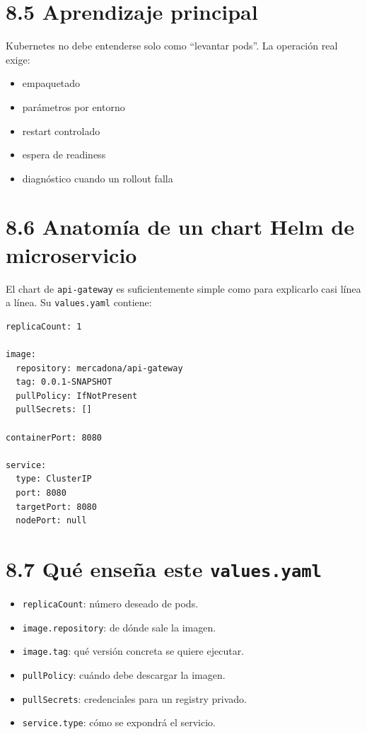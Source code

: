 \documentclass[
a4paper,
12pt]{report}
\providecommand{\tightlist}{%
  \setlength{\itemsep}{0pt}\setlength{\parskip}{0pt}}
\begin{document}
\section{8.5 Aprendizaje principal}\label{aprendizaje-principal}

Kubernetes no debe entenderse solo como ``levantar pods''. La operación
real exige:

\begin{itemize}
\tightlist
\item
  empaquetado
\item
  parámetros por entorno
\item
  restart controlado
\item
  espera de readiness
\item
  diagnóstico cuando un rollout falla
\end{itemize}

\section{8.6 Anatomía de un chart Helm de
microservicio}\label{anatomuxeda-de-un-chart-helm-de-microservicio}

El chart de \texttt{api-gateway} es suficientemente simple como para
explicarlo casi línea a línea. Su \texttt{values.yaml} contiene:

\begin{verbatim}
replicaCount: 1

image:
  repository: mercadona/api-gateway
  tag: 0.0.1-SNAPSHOT
  pullPolicy: IfNotPresent
  pullSecrets: []

containerPort: 8080

service:
  type: ClusterIP
  port: 8080
  targetPort: 8080
  nodePort: null
\end{verbatim}

\section{\texorpdfstring{8.7 Qué enseña este
\texttt{values.yaml}}{8.7 Qué enseña este values.yaml}}\label{quuxe9-enseuxf1a-este-values.yaml}

\begin{itemize}
\tightlist
\item
  \texttt{replicaCount}: número deseado de pods.
\item
  \texttt{image.repository}: de dónde sale la imagen.
\item
  \texttt{image.tag}: qué versión concreta se quiere ejecutar.
\item
  \texttt{pullPolicy}: cuándo debe descargar la imagen.
\item
  \texttt{pullSecrets}: credenciales para un registry privado.
\item
  \texttt{service.type}: cómo se expondrá el servicio.
\end{itemize}
\end{document}
